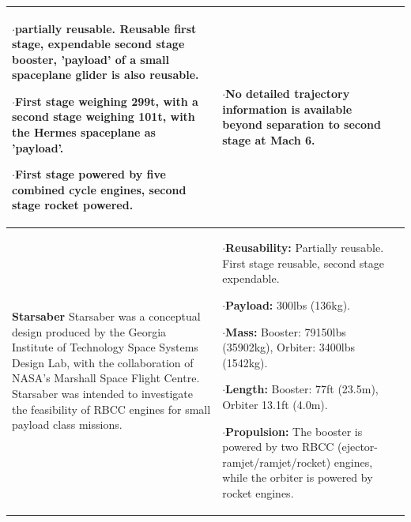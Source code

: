 {\begin{landscape}
\begin{xltabular}{\linewidth}{|X|X|X|}
$\cdot$partially reusable. Reusable first stage, expendable second stage booster, 'payload' of a small spaceplane glider is also reusable. 

$\cdot$First stage weighing 299t, with a second stage weighing 101t, with the Hermes spaceplane as 'payload'. 

$\cdot$First stage powered by five combined cycle engines, second stage rocket powered. 
	
	&\small
	$\cdot$No detailed trajectory information is available beyond separation to second stage at Mach 6. 
	
	\\
	\hline \small 
	\textbf{Starsaber}\cite{Germain2001}\newline\newline
	Starsaber was a conceptual design produced by the Georgia Institute of Technology Space Systems Design Lab, with the collaboration of NASA's Marshall Space Flight Centre. Starsaber was intended to investigate the feasibility of RBCC engines for small payload class missions. 
	&\small
	
	$\cdot$\textbf{Reusability:} Partially reusable. First stage reusable, second stage expendable. 
	
	$\cdot$\textbf{Payload:} 300lbs (136kg). 
	
	$\cdot$\textbf{Mass:} Booster: 79150lbs (35902kg), Orbiter: 3400lbs (1542kg). 
	
	$\cdot$\textbf{Length:} Booster: 77ft (23.5m), Orbiter 13.1ft (4.0m).
	
	$\cdot$\textbf{Propulsion:} The booster is powered by two RBCC (ejector-ramjet/ramjet/rocket) engines, while the orbiter is powered by rocket engines.  
	

\end{xltabular}
\end{landscape}}
